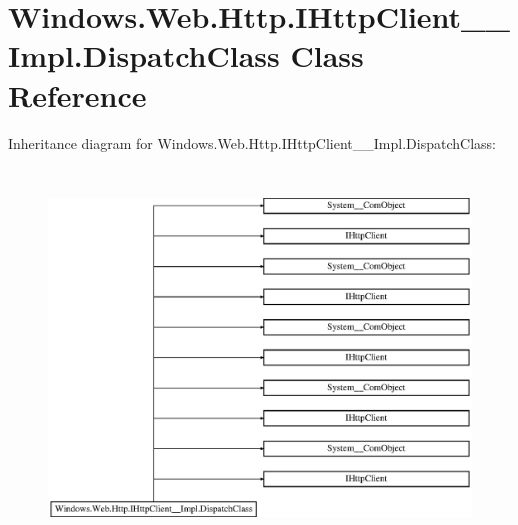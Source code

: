 \hypertarget{class_windows_1_1_web_1_1_http_1_1_i_http_client_____impl_1_1_dispatch_class}{}\section{Windows.\+Web.\+Http.\+I\+Http\+Client\+\_\+\+\_\+\+Impl.\+Dispatch\+Class Class Reference}
\label{class_windows_1_1_web_1_1_http_1_1_i_http_client_____impl_1_1_dispatch_class}
Inheritance diagram for Windows.\+Web.\+Http.\+I\+Http\+Client\+\_\+\+\_\+\+Impl.\+Dispatch\+Class\+:\begin{figure}[H]
\begin{center}
\leavevmode
\includegraphics[height=10.065359cm]{class_windows_1_1_web_1_1_http_1_1_i_http_client_____impl_1_1_dispatch_class}
\end{center}
\end{figure}
